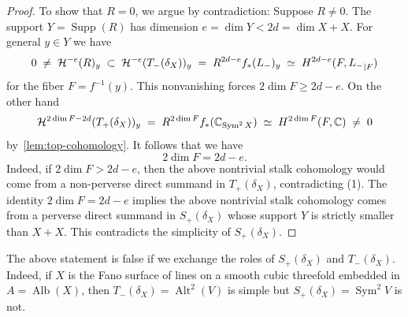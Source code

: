 \documentclass[a4paper]{amsart}
\newcommand{\bbC}{\mathbb{C}}
\newcommand{\cH}{\mathcal{H}}
\newcommand{\rH}{\textup{H}}
\DeclareMathOperator{\Alb}{Alb}
\DeclareMathOperator{\Sym}{Sym}
\DeclareMathOperator{\Supp}{Supp}
\DeclareMathOperator{\Alt}{Alt}
\renewcommand{\ge}{\geqslant}
\theoremstyle{plain}
\theoremstyle{definition}
\numberwithin{equation}{section}
\begin{document}
\begin{proof}
To show that $R= 0$, we argue by contradiction: Suppose $R\neq 0$. The support $Y=\Supp(R)$ has dimension $e=\dim Y < 2d = \dim X + X$. For general $y\in Y$ we have
%
\[
 0 \;\neq\; 
 \cH^{-e}(R)_y 
 \;\subset\;
 \cH^{-e}(T_-(\delta_X))_y 
 \;=\;
 R^{2d-e}f_* (L_-)_y
 \;\simeq\; 
 \rH^{2d-e}(F, {L_-}_{\vert F})
\]
%
for the fiber $F = f^{-1}(y)$. 
This nonvanishing forces $2 \dim F \ge 2d-e$. On the other hand 
%
\[
 \cH^{2\dim F-2d}(T_+(\delta_X))_y \;=\; R^{2\dim F} f_*(\bbC_{\Sym^2 X}) \;\simeq\; \rH^{2\dim F}(F, \bbC) \;\neq\; 0
\] 
%
by~\cref{lem:top-cohomology}. It follows that we have
\[ 2\dim F = 2d-e. \]
Indeed, if $2\dim F > 2d-e$, then the above nontrivial stalk cohomology would come from a non-perverse direct summand in $T_+(\delta_X)$, contradicting (1). The identity $2\dim F = 2d-e$ implies the above nontrivial stalk cohomology comes from a perverse direct summand in $S_+(\delta_X)$ whose support $Y$ is strictly smaller than $X+X$. This contradicts the simplicity of $S_+(\delta_X)$.
\end{proof}

The above statement is false if we exchange the roles of $S_+(\delta_X)$ and $T_-(\delta_X)$. Indeed, if $X$ is the Fano surface of lines on a smooth cubic threefold embedded in $A = \Alb(X)$, then $T_-(\delta_X) = \Alt^2(V)$ is simple but $S_+(\delta_X) = \Sym^2 V$ is not.
\end{document}
